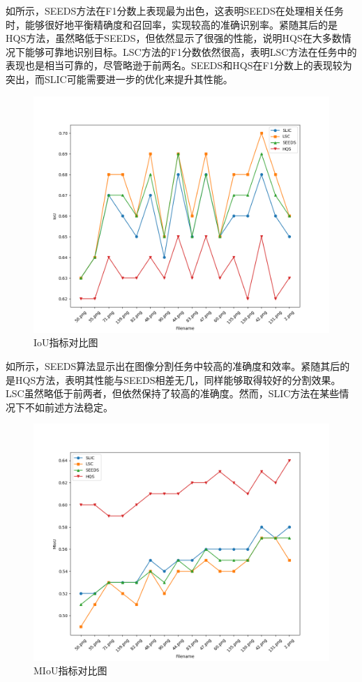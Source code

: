 如所示，SEEDS方法在F1分数上表现最为出色，这表明SEEDS在处理相关任务时，能够很好地平衡精确度和召回率，实现较高的准确识别率。紧随其后的是HQS方法，虽然略低于SEEDS，但依然显示了很强的性能，说明HQS在大多数情况下能够可靠地识别目标。LSC方法的F1分数依然很高，表明LSC方法在任务中的表现也是相当可靠的，尽管略逊于前两名。SEEDS和HQS在F1分数上的表现较为突出，而SLIC可能需要进一步的优化来提升其性能。

\newpage

\begin{figure}[htbp]
	\centering
	\includegraphics[width=1\textwidth]{pic/IoU.png}
	\caption{IoU指标对比图}
    \label{fig:iou}
\end{figure}

如所示，SEEDS算法显示出在图像分割任务中较高的准确度和效率。紧随其后的是HQS方法，表明其性能与SEEDS相差无几，同样能够取得较好的分割效果。LSC虽然略低于前两者，但依然保持了较高的准确度。然而，SLIC方法在某些情况下不如前述方法稳定。

\begin{figure}[htbp]
	\centering
	\includegraphics[width=1\textwidth]{pic/MIoU.png}
	\caption{MIoU指标对比图}
    \label{fig:miou}
\end{figure}

